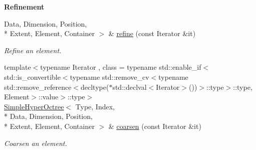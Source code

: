 \begin{Indent}{\bf Refinement}
\begin{DoxyCompactItemize}
Data, Dimension, Position, \\*
Extent, Element, Container $>$ \& \hyperlink{exceptionmagrathea_1_1SimpleHyperOctree_a5c599cb700f1bf683099b57fcef24686}{refine} (const Iterator \&it)
\begin{DoxyCompactList}\small\item\em Refine an element. \end{DoxyCompactList}\item 
{\footnotesize template$<$typename Iterator , class  = typename std\-::enable\-\_\-if$<$std\-::is\-\_\-convertible$<$typename std\-::remove\-\_\-cv$<$typename std\-::remove\-\_\-reference$<$decltype($\ast$std\-::declval$<$\-Iterator$>$())$>$\-::type$>$\-::type, Element$>$\-::value$>$\-::type$>$ }\\\hyperlink{exceptionmagrathea_1_1SimpleHyperOctree}{Simple\-Hyper\-Octree}$<$ Type, Index, \\*
Data, Dimension, Position, \\*
Extent, Element, Container $>$ \& \hyperlink{exceptionmagrathea_1_1SimpleHyperOctree_a2ac5a048e26ef111d3feab31c0053354}{coarsen} (const Iterator \&it)
\begin{DoxyCompactList}\small\item\em Coarsen an element. \end{DoxyCompactList}\end{DoxyCompactItemize}
\end{Indent}
